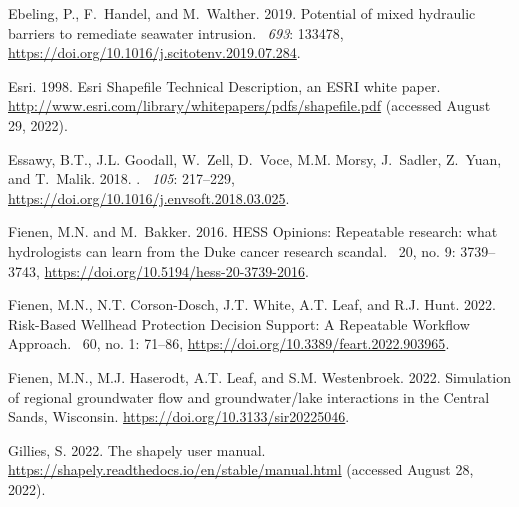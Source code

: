 \documentclass[12pt, oneside]{article}  	%
\begin{document}
\begin{thebibliography}{}
Ebeling, P., F.~Handel, and M.~Walther. 2019.
\newblock Potential of mixed hydraulic barriers to remediate seawater
  intrusion.
~{\em 693}: 133478,
  \url{https://doi.org/10.1016/j.scitotenv.2019.07.284}.

Esri. 1998.
\newblock Esri Shapefile Technical Description, an ESRI white paper.
\newblock \url{http://www.esri.com/library/whitepapers/pdfs/shapefile.pdf}
  (accessed August 29, 2022).

Essawy, B.T., J.L. Goodall, W.~Zell, D.~Voce, M.M. Morsy, J.~Sadler, Z.~Yuan,
  and T.~Malik. 2018.
.
~{\em 105}: 217--229,
  \url{https://doi.org/10.1016/j.envsoft.2018.03.025}.

Fienen, M.N. and M.~Bakker. 2016.
\newblock HESS Opinions: Repeatable research: what hydrologists can learn from
  the Duke cancer research scandal.
~20, no. 9: 3739--3743,
  \url{https://doi.org/10.5194/hess-20-3739-2016}.

Fienen, M.N., N.T. Corson-Dosch, J.T. White, A.T. Leaf, and R.J. Hunt. 2022.
\newblock Risk-Based Wellhead Protection Decision Support: A Repeatable
  Workflow Approach.
~60, no. 1: 71--86,
  \url{https://doi.org/10.3389/feart.2022.903965}.

Fienen, M.N., M.J. Haserodt, A.T. Leaf, and S.M. Westenbroek. 2022.
\newblock Simulation of regional groundwater flow and groundwater/lake
  interactions in the Central Sands, Wisconsin.
 \url{https://doi.org/10.3133/sir20225046}.

Gillies, S. 2022.
\newblock The shapely user manual.
\newblock \url{https://shapely.readthedocs.io/en/stable/manual.html} (accessed
  August 28, 2022).


\end{thebibliography}
\end{document}
